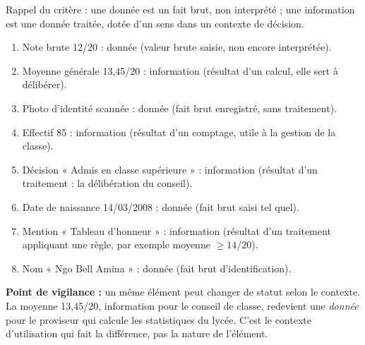 \documentclass[11pt]{article}
\newcommand{\cle}[1]{{\popxbold\color{popdark}#1}}
\begin{document}
\begin{corrige}
Rappel du critère : une \cle{donnée} est un fait brut, non interprété ; une \cle{information} est une donnée traitée, dotée d'un sens dans un contexte de décision.

\begin{enumerate}
\item Note brute 12/20 : \cle{donnée} (valeur brute saisie, non encore interprétée).
\item Moyenne générale 13,45/20 : \cle{information} (résultat d'un calcul, elle sert à délibérer).
\item Photo d'identité scannée : \cle{donnée} (fait brut enregistré, sans traitement).
\item Effectif 85 : \cle{information} (résultat d'un comptage, utile à la gestion de la classe).
\item Décision « Admis en classe supérieure » : \cle{information} (résultat d'un traitement : la délibération du conseil).
\item Date de naissance 14/03/2008 : \cle{donnée} (fait brut saisi tel quel).
\item Mention « Tableau d'honneur » : \cle{information} (résultat d'un traitement appliquant une règle, par exemple moyenne $\geq 14/20$).
\item Nom « Ngo Bell Amina » : \cle{donnée} (fait brut d'identification).
\end{enumerate}

\textbf{Point de vigilance :} un même élément peut changer de statut selon le contexte. La moyenne 13,45/20, information pour le conseil de classe, redevient une \emph{donnée} pour le proviseur qui calcule les statistiques du lycée. C'est le contexte d'utilisation qui fait la différence, pas la nature de l'élément.
\end{corrige}
\end{document}
